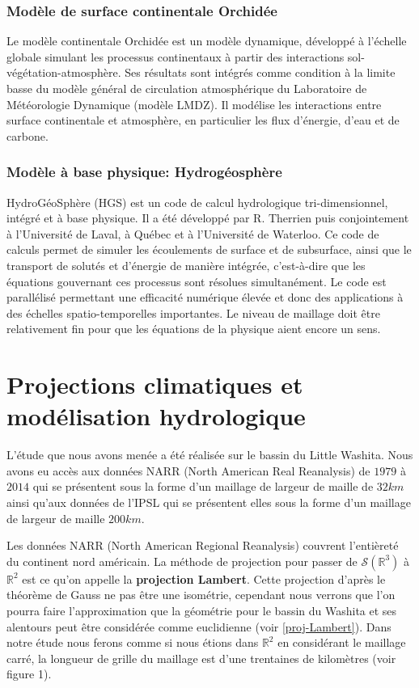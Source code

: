 \documentclass[a4paper,11pt]{article}
\begin{document}
\subsubsection{Modèle de surface continentale Orchidée}

Le modèle continentale Orchidée est un modèle dynamique, développé à l’échelle globale simulant les processus continentaux à partir des interactions sol-végétation-atmosphère. Ses résultats sont intégrés comme condition à la limite basse du modèle général de circulation atmosphérique du Laboratoire de Météorologie Dynamique (modèle LMDZ). Il modélise les interactions entre surface continentale et atmosphère, en particulier les flux d'énergie, d'eau et de carbone. 



\subsubsection{Modèle à base physique: Hydrogéosphère}

HydroGéoSphère (HGS) est un code de calcul hydrologique tri-dimensionnel, intégré et à base physique. Il a été développé par R. Therrien puis conjointement à l’Université de Laval, à Québec et à l’Université de Waterloo. Ce code de calculs permet de simuler les écoulements de surface et de subsurface, ainsi que le transport de solutés et d’énergie de manière intégrée, c’est-à-dire que les équations gouvernant ces processus sont résolues simultanément. Le code est parallélisé permettant une efficacité numérique élevée et donc des applications à des échelles spatio-temporelles importantes. Le niveau de maillage doit être relativement fin pour que les équations de la physique aient encore un sens. 



\section{Projections climatiques et modélisation hydrologique}
\label{ch-pred-cli}
L'étude que nous avons menée a été réalisée sur le bassin du Little Washita. Nous avons eu accès aux données NARR (North American Real Reanalysis) de $1979$ à $2014$ qui se présentent sous la forme d'un maillage de largeur de maille de $32 km$ ainsi qu'aux données de l'IPSL qui se présentent elles sous la forme d'un maillage de largeur de maille $200 km$.

Les données NARR (North American Regional Reanalysis) couvrent l'entièreté du continent nord américain. La méthode de projection pour passer de $\mathcal{S}(\mathbb{R}^3)$ à $\mathbb{R}^2$ est ce qu'on appelle la \textbf{projection Lambert}. Cette projection d'après le théorème de Gauss ne pas être une isométrie, cependant nous verrons que l'on pourra faire l'approximation que la géométrie pour le bassin du Washita et ses alentours peut être considérée comme euclidienne (voir \ref{proj-Lambert}). Dans notre étude nous ferons comme si nous étions dans $\mathbb{R}^2$ en considérant le maillage carré, la longueur de grille du maillage est d'une trentaines de kilomètres (voir figure 1).
\end{document}
